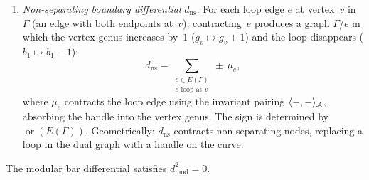 \begin{definition}
\begin{enumerate}[label=\textup{(\roman*)}]
\item \emph{Non-separating boundary differential} $d_{\mathrm{ns}}$.
  For each loop edge $e$ at vertex~$v$ in~$\Gamma$
  (an edge with both endpoints at~$v$),
  contracting~$e$ produces a graph $\Gamma / e$ in which
  the vertex genus increases by~$1$ ($g_v \mapsto g_v + 1$)
  and the loop disappears ($b_1 \mapsto b_1 - 1$):
  \begin{equation}\label{eq:d-nonsep}
  d_{\mathrm{ns}} = \sum_{\substack{e \in E(\Gamma) \\
    e \text{ loop at } v}}
  \pm\, \mu_e,
  \end{equation}
  where $\mu_e$ contracts the loop edge using the invariant
  pairing $\langle -, - \rangle_{\mathcal{A}}$, absorbing the handle
  into the vertex genus.  The sign is determined by
  $\operatorname{or}(E(\Gamma))$.
  Geometrically: $d_{\mathrm{ns}}$ contracts non-separating
  nodes, replacing a loop in the dual graph with a handle on
  the curve.
\end{enumerate}
\end{definition}

\begin{proposition}[$d_{\mathrm{mod}}^2 = 0$;
\ClaimStatusProvedHere]\label{prop:d-mod-squared-zero}
The modular bar differential satisfies $d_{\mathrm{mod}}^2 = 0$.
\end{proposition}

